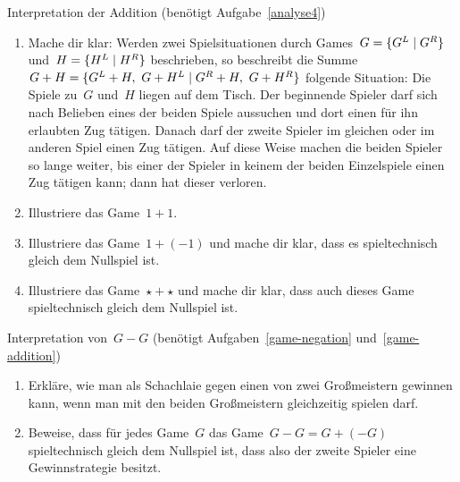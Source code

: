 \documentclass{../zirkelblatt}
\begin{document}
\begin{aufgabe}{Interpretation der Addition (benötigt Aufgabe~\ref{analyse4})}
\label{game-addition}
\begin{enumerate}
\item Mache dir klar: Werden zwei Spielsituationen durch Games~$G =
\{ G^L \mathrel{|} G^R \}$ und~$H = \{ H^L \mathrel{|} H^R \}$ beschrieben, so beschreibt die Summe~$G
+ H = \{ G^L + H,\ G + H^L \mathrel{|} G^R + H,\ G + H^R \}$ folgende Situation: Die
Spiele zu~$G$ und~$H$ liegen auf dem Tisch. Der beginnende Spieler darf sich
nach Belieben eines der beiden Spiele aussuchen und dort einen für ihn
erlaubten Zug tätigen. Danach darf der zweite Spieler im gleichen oder im
anderen Spiel einen Zug tätigen. Auf diese Weise machen die beiden Spieler so
lange weiter, bis einer der Spieler in keinem der beiden Einzelspiele einen Zug
tätigen kann; dann hat dieser verloren.
\item Illustriere das Game~$1 + 1$.
\item Illustriere das Game~$1 + (-1)$ und mache dir klar, dass es
spieltechnisch gleich dem Nullspiel ist.
\item Illustriere das Game~$\star + \star$ und mache dir klar, dass auch dieses
Game spieltechnisch gleich dem Nullspiel ist.
\end{enumerate}
\end{aufgabe}

\begin{aufgabe}{Interpretation von~$G - G$ (benötigt
Aufgaben~\ref{game-negation} und~\ref{game-addition})}
\label{game-gg}
\begin{enumerate}
\item Erkläre, wie man als Schachlaie gegen einen von zwei Großmeistern
gewinnen kann, wenn man mit den beiden Großmeistern gleichzeitig spielen darf.
\item Beweise, dass für jedes Game~$G$ das Game~$G - G = G + (-G)$ spieltechnisch
gleich dem Nullspiel ist, dass also der zweite Spieler eine Gewinnstrategie
besitzt.
\end{enumerate}
\end{aufgabe}
\end{document}
